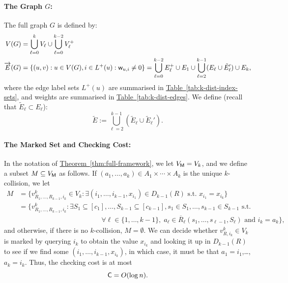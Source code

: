 \documentclass{article}
\newcommand{\thm}[1]{\hyperref[thm:#1]{Theorem~\ref*{thm:#1}}}
\newcommand{\tabl}[1]{\hyperref[tab:#1]{Table~\ref*{tab:#1}}}
\renewcommand{\>}{\rangle}
\newcommand{\<}{\langle}
\renewcommand{\(}{\left(}
\renewcommand{\)}{\right)}
\def\w{{\sf w}}
\begin{document}
\paragraph{The Graph $G$:} The full graph $G$ is defined by:
\begin{align*}
V(G)&=\bigcup_{\ell=0}^{k} V_{\ell}\cup \bigcup_{\ell=0}^{k-2} V_{\ell}^+\\
\overrightarrow{E}(G) &= \{(u,v):u\in V(G), i\in L^+(u):\w_{u,i}\neq 0\}=\bigcup_{\ell=0}^{k-2} E_{\ell}^+\cup E_1 \cup \bigcup_{\ell=2}^{k-1} (E_{\ell}\cup \tilde{E}_{\ell}')\cup E_k,
\end{align*}
where the edge label sets $L^+(u)$ are summarised in \tabl{k-dist-index-sets}, and weights are summarised in \tabl{k-dist-edges}. We define (recall that $\tilde{E}_{\ell}\subset E_{\ell}$): 
\begin{equation}
\tilde{E}:=\bigcup_{\ell=2}^{k-1}(\tilde{E}_{\ell}\cup\tilde{E}_{\ell}').\label{eq:k-dist-tilde-E}
\end{equation}



\paragraph{The Marked Set and Checking Cost:}  In the notation of \thm{full-framework}, we let $V_{\sf M}=V_k$, and we define a subset $M\subseteq V_{\sf M}$ as follows. 
If $(a_1,\dots,a_k)\in A_1\times \cdots \times A_k$ is the unique $k$-collision, we let 
\begin{equation}
\begin{split}
	M &= \big\{v^{k}_{R_1,\dots,R_{k-1},i_k} \in V_{k}: \exists (i_1,\dots,i_{k-1},x_{i_1})\in D_{k-1}(R)\mbox{ s.t. }x_{i_1}=x_{i_k}\}\\
&= \big\{v^k_{R_1,\dots,R_{k-1},i_k}: \exists 
S_{1} \subseteq [c_{1}],\dots,S_{k-1} \subseteq [c_{k-1}], s_1 \in S_1,\dots,s_{k-1} \in S_{k-1} \text{ s.t. }\\
	&\qquad\qquad\qquad\qquad\qquad\qquad \forall \ell \in \{1,\dots,k-1\},\; a_{\ell} \in \overline{R}_{\ell}(s_1,\dots,s_{\ell-1},S_{\ell})\mbox{ and }i_k = a_k\big\},
\end{split}\label{eq:k-dist-M}
\end{equation}
and otherwise, if there is no $k$-collision, $M=\emptyset$. We can decide whether $v^{k}_{R,i_k} \in V_{k}$ is marked by querying $i_k$ to obtain the value $x_{i_k}$ and looking it up in $D_{k-1}(R)$ to see if we find some $(i_1,\dots,i_{k-1},x_{i_k})$, in which case, it must be that $a_1=i_1$,\dots,$a_k=i_k$. Thus, the checking cost is at most
\begin{equation}
	{\sf C}=O(\log n).\label{eq:k-dist-C}
\end{equation}
\end{document}
